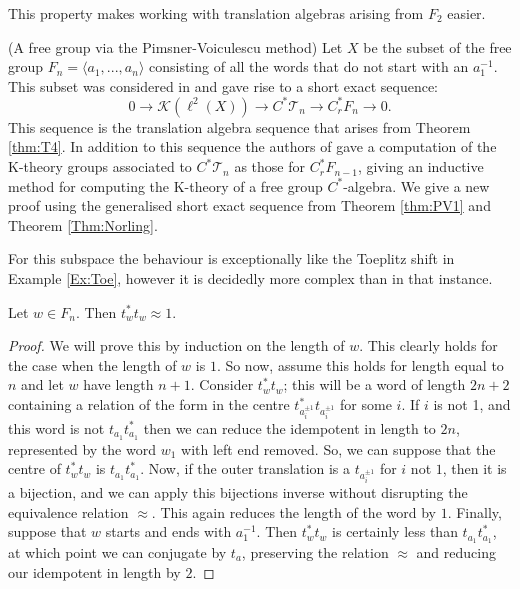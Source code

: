 This property makes working with translation algebras arising from $F_{2}$ easier.

\begin{example}\label{ex:PV}(A free group via the Pimsner-Voiculescu method)
Let $X$ be the subset of the free group $F_{n}=\langle a_{1},...,a_{n} \rangle$ consisting of all the words that do not start with an $a_{1}^{-1}$. This subset was considered in \cite{MR670181} and gave rise to a short exact sequence:
\begin{equation*}
0 \rightarrow \mathcal{K}(\ell^{2}(X)) \rightarrow C^{*}\mathcal{T}_{n} \rightarrow C^{*}_{r}F_{n} \rightarrow 0.
\end{equation*}
This sequence is the translation algebra sequence that arises from Theorem \ref{thm:T4}. In addition to this sequence the authors of \cite{MR670181} gave a computation of the K-theory groups associated to $C^{*}\mathcal{T}_{n}$ as those for $C^{*}_{r}F_{n-1}$, giving an inductive method for computing the K-theory of a free group $C^{*}$-algebra. We give a new proof using the generalised short exact sequence from Theorem \ref{thm:PV1} and Theorem \ref{Thm:Norling}.

For this subspace the behaviour is exceptionally like the Toeplitz shift in Example \ref{Ex:Toe}, however it is decidedly more complex than in that instance.

\begin{claim}
Let $w \in F_{n}$. Then $t_{w}^{*}t_{w}\approx 1$.
\end{claim}
\begin{proof}
We will prove this by induction on the length of $w$. This clearly holds for the case when the length of $w$ is $1$. So now, assume this holds for length equal to $n$ and let $w$ have length $n+1$. Consider $t_{w}^{*}t_{w}$; this will be a word of length $2n+2$ containing a relation of the form in the centre $t_{a_{i}^{\pm 1}}^{*}t_{a_{i}^{\pm 1}}$ for some $i$. If $i$ is not 1, and this word is not $t_{a_{1}}t_{a_{1}}^{*}$ then we can reduce the idempotent in length to $2n$, represented by the word $w_{1}$ with left end removed. So, we can suppose that the centre of $t_{w}^{*}t_{w}$ is $t_{a_{1}}t_{a_{1}}^{*}$. Now, if the outer translation is a $t_{a_{i}^{\pm 1}}$ for $i$ not $1$, then it is a bijection, and we can apply this bijections inverse without disrupting the equivalence relation $\approx$. This again reduces the length of the word by $1$. Finally, suppose that $w$ starts and ends with $a_{1}^{-1}$. Then $t_{w}^{*}t_{w}$ is certainly less than $t_{a_{1}}t_{a_{1}}^{*}$, at which point we can conjugate by $t_{a}$, preserving the relation $\approx$ and reducing our idempotent in length by $2$. 
\end{proof}


\end{example}
